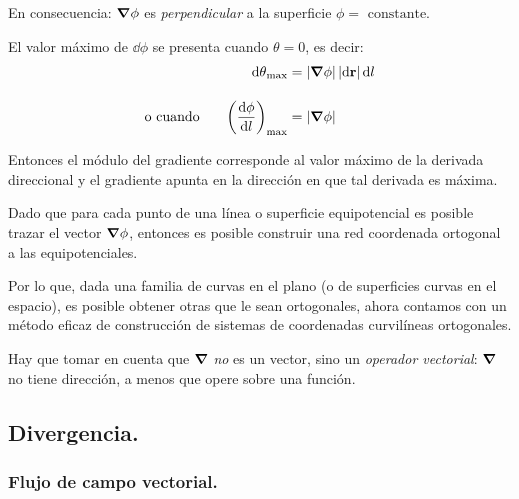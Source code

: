 \documentclass[12pt]{article}
\numberwithin{equation}{section}
\begin{document}
En consecuencia: $\grad{\phi}$ es \emph{perpendicular} a la superficie $\phi = \mbox{ constante}$.
\par
El valor máximo de $\dd{\phi}$ se presenta cuando $\theta = 0$, es decir:
\begin{align*}
\dd{\theta}_{\max} &= \abs{\grad{\phi}} \, \abs{\dd{\vb{r}}} \dd{l} \\[1em]
\mbox{o cuando } \hspace{0.5cm} \left( \dv{\phi}{l} \right)_{\max} &= \abs{\grad{\phi}}
\end{align*}

Entonces el módulo del gradiente corresponde al valor máximo de la derivada direccional y el gradiente apunta en la dirección en que tal derivada es máxima.
\par
Dado que para cada punto de una línea o superficie equipotencial es posible trazar el vector $\grad{\phi}$, entonces es posible construir una red coordenada ortogonal a las equipotenciales.
\par
Por lo que, dada una familia de curvas en el plano (o de superficies curvas en el espacio), es posible obtener otras que le sean ortogonales, ahora contamos con un método eficaz de construcción de sistemas de coordenadas curvilíneas ortogonales.
\par
Hay que tomar en cuenta que $\grad$ \emph{no} es un vector, sino un \emph{operador vectorial}: $\grad$ no tiene dirección, a menos que opere sobre una función.

\subsection{Divergencia.}

\subsubsection{Flujo de campo vectorial.}
\end{document}
